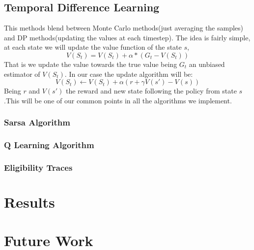 \documentclass{article}
\begin{document}
\subsection{Temporal Difference Learning}
This methods blend between Monte Carlo methods(just averaging the samples) and DP methods(updating the values at each timestep). The idea is fairly simple, at each state we will update the value function of the state $s$, $$V(S_{t}) = V(S_{t}) + \alpha * (G_{t} - V(S_{t}))$$That is we update the value towards the true value being $G_{t}$ an unbiased estimator of $V(S_{t})$. In our case the update algorithm will be:\newline
$$V(S_{t}) \leftarrow V(S_{t}) + \alpha (r + \gamma V(s') - V(s))$$ Being $r$ and $V(s')$ the reward and new state following the policy from state $s$.This will be one of our common points in all the algorithms we implement.\newline
\subsubsection{Sarsa Algorithm}
\subsubsection{Q Learning Algorithm}
\subsubsection{Eligibility Traces}

\section{Results}
\section{Future Work}
\end{document}
